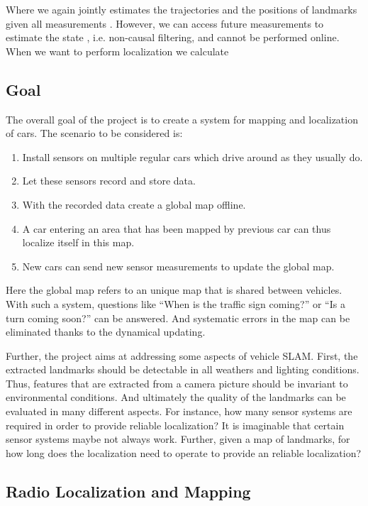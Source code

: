 Where we again jointly estimates the trajectories  and the positions
of landmarks  given all measurements . However, we can access future
measurements to estimate the state , i.e. non-causal filtering, and
cannot be performed online. When we want to perform localization we
calculate


\subsection{Goal}

The overall goal of the project is to create a system for mapping and
localization of cars. The scenario to be considered is:
\begin{enumerate}
\item  Install sensors on multiple regular cars which drive around as
  they usually do.
\item Let these sensors record and store data.
\item With the recorded data create a global map offline.
\item A car entering an area that has been mapped by previous car can
  thus localize itself in this map.
\item New cars can send new sensor measurements to update the global
  map.
\end{enumerate}

Here the global map refers to an unique map that is shared between
vehicles. With such a system, questions like ``When is the traffic sign
coming?'' or  ``Is a turn coming soon?'' can be answered. And systematic
errors in the map can be eliminated thanks to the dynamical updating.

Further, the project aims at addressing some aspects of vehicle
\gls{SLAM}. First, the extracted landmarks should be detectable in all
weathers and lighting conditions. Thus, features that are extracted
from a camera picture should be invariant to environmental
conditions. And ultimately the quality of the landmarks can be
evaluated in many different aspects. For instance, how many sensor
systems are required in order to provide reliable localization? It is
imaginable that certain sensor systems maybe not always work. Further,
given a map of landmarks, for how long does the localization need to
operate to provide an reliable localization?

\subsection{Radio Localization and Mapping}

